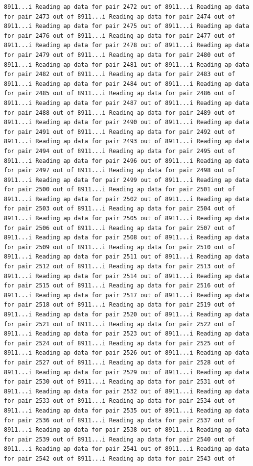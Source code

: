 \documentclass[
]{article}
\begin{document}
\begin{verbatim}
8911...i Reading ap data for pair 2472 out of 8911...i Reading ap data for pair 2473 out of 8911...i Reading ap data for pair 2474 out of 8911...i Reading ap data for pair 2475 out of 8911...i Reading ap data for pair 2476 out of 8911...i Reading ap data for pair 2477 out of 8911...i Reading ap data for pair 2478 out of 8911...i Reading ap data for pair 2479 out of 8911...i Reading ap data for pair 2480 out of 8911...i Reading ap data for pair 2481 out of 8911...i Reading ap data for pair 2482 out of 8911...i Reading ap data for pair 2483 out of 8911...i Reading ap data for pair 2484 out of 8911...i Reading ap data for pair 2485 out of 8911...i Reading ap data for pair 2486 out of 8911...i Reading ap data for pair 2487 out of 8911...i Reading ap data for pair 2488 out of 8911...i Reading ap data for pair 2489 out of 8911...i Reading ap data for pair 2490 out of 8911...i Reading ap data for pair 2491 out of 8911...i Reading ap data for pair 2492 out of 8911...i Reading ap data for pair 2493 out of 8911...i Reading ap data for pair 2494 out of 8911...i Reading ap data for pair 2495 out of 8911...i Reading ap data for pair 2496 out of 8911...i Reading ap data for pair 2497 out of 8911...i Reading ap data for pair 2498 out of 8911...i Reading ap data for pair 2499 out of 8911...i Reading ap data for pair 2500 out of 8911...i Reading ap data for pair 2501 out of 8911...i Reading ap data for pair 2502 out of 8911...i Reading ap data for pair 2503 out of 8911...i Reading ap data for pair 2504 out of 8911...i Reading ap data for pair 2505 out of 8911...i Reading ap data for pair 2506 out of 8911...i Reading ap data for pair 2507 out of 8911...i Reading ap data for pair 2508 out of 8911...i Reading ap data for pair 2509 out of 8911...i Reading ap data for pair 2510 out of 8911...i Reading ap data for pair 2511 out of 8911...i Reading ap data for pair 2512 out of 8911...i Reading ap data for pair 2513 out of 8911...i Reading ap data for pair 2514 out of 8911...i Reading ap data for pair 2515 out of 8911...i Reading ap data for pair 2516 out of 8911...i Reading ap data for pair 2517 out of 8911...i Reading ap data for pair 2518 out of 8911...i Reading ap data for pair 2519 out of 8911...i Reading ap data for pair 2520 out of 8911...i Reading ap data for pair 2521 out of 8911...i Reading ap data for pair 2522 out of 8911...i Reading ap data for pair 2523 out of 8911...i Reading ap data for pair 2524 out of 8911...i Reading ap data for pair 2525 out of 8911...i Reading ap data for pair 2526 out of 8911...i Reading ap data for pair 2527 out of 8911...i Reading ap data for pair 2528 out of 8911...i Reading ap data for pair 2529 out of 8911...i Reading ap data for pair 2530 out of 8911...i Reading ap data for pair 2531 out of 8911...i Reading ap data for pair 2532 out of 8911...i Reading ap data for pair 2533 out of 8911...i Reading ap data for pair 2534 out of 8911...i Reading ap data for pair 2535 out of 8911...i Reading ap data for pair 2536 out of 8911...i Reading ap data for pair 2537 out of 8911...i Reading ap data for pair 2538 out of 8911...i Reading ap data for pair 2539 out of 8911...i Reading ap data for pair 2540 out of 8911...i Reading ap data for pair 2541 out of 8911...i Reading ap data for pair 2542 out of 8911...i Reading ap data for pair 2543 out of 
\end{verbatim}
\end{document}

